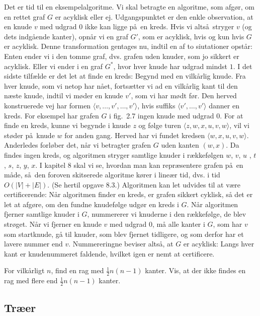 Det er tid til en eksempelalgoritme.
Vi skal betragte en algoritme, som afgør, om en rettet graf $G$ er acyklisk eller ej.
Udgangspunktet er den enkle observation, at en knude $v$ med udgrad $0$ ikke kan ligge på en kreds.
Hvis vi altså stryger $v$ (og dets indgående kanter), opnår vi en graf $G'$, som er acyklisk, hvis og kun hvis $G$ er acyklisk.
Denne transformation gentages nu, indtil en af to siutationer opstår:
Enten ender vi i den tomme graf, dvs. grafen uden knuder, som jo sikkert er acyklisk.
Eller vi ender i en graf $G^*$, hvor hver knude har udgrad mindst $1$.
I det sidste tilfælde er det let at finde en kreds:
Begynd med en vilkårlig knude.
Fra hver knude, som vi netop har nået, fortsætter vi ad en vilkårlig kant til den næste knude, indtil vi møder en knude $v'$, som vi har mødt før.
Den herved konstruerede vej har formen $\langle v, \ldots, v',\ldots, v'\rangle$, hvis suffiks $\langle v',\ldots,v'\rangle$ danner en kreds.
For eksempel har grafen $G$ i fig.~2.7 ingen knude med udgrad $0$.
For at finde en kreds, kunne vi begynde i knude $z$ og følge turen $\langle z,w,x,u,v,w\rangle$, vil vi støder på knude $w$ for anden gang.
Herved har vi fundet kredsen $\langle w,x,u,v,w\rangle$.
Anderledes forløber det, når vi betragter grafen $G$ uden kanten $(w,x)$.
Da findes ingen kreds, og algoritmen stryger samtlige knuder i rækkefølgen $w$, $v$, $u$ , $t$, $s$, $z$, $y$, $x$.
I kapitel 8 skal vi se, hvordan man kan repræsentere grafen på en måde, så den foroven skitserede algoritme kører i lineær tid, dvs. i tid $O(|V|+|E|)$.
(Se hertil opgave 8.3.)
Algoritmen kan let udvides til at være certificerende:
Når algoritmen finder en kreds, er grafen sikkert cyklisk, så det er let at afgøre, om den fundne knudefølge udgør en kreds i $G$.
Når algoritmen fjerner samtlige knuder i $G$, nummererer vi knuderne i den rækkefølge, de blev strøget.
Når vi fjerner en knude $v$ med udgrad $0$, må alle kanter i $G$, som har $v$ som startknude, gå til knuder, som blev fjernet tidligere, og som derfor har et lavere nummer end $v$. 
Nummereringne beviser altså, at $G$ er acyklisk:
Langs hver kant er knudenummeret faldende, hvilket igen er nemt at certificere.

\begin{exerc}
For vilkårligt $n$, find en rag med $\frac{1}{2}n(n-1)$ kanter.
Vis, at der ikke findes en rag med flere end $\frac{1}{2}n(n-1)$ kanter.
\end{exerc}

\subsection{Træer}

